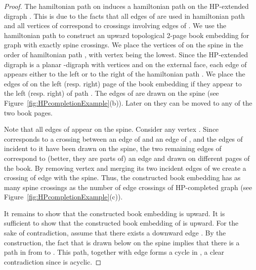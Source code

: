 \documentclass{myllncs-mixalis}
\begin{document}
\begin{proof}
 The hamiltonian path  on  induces a hamiltonian path
  on the HP-extended digraph . This is due to the facts that all
 edges of  are used in hamiltonian path  and all vertices of
  correspond to crossings involving edges of . We  use
 the hamiltonian path  to construct an upward topological
 2-page book embedding for graph  with exactly  spine
 crossings. We place the vertices of  on the spine in the order
 of hamiltonian path , with vertex  being the lowest.
 Since the HP-extended digraph  is a planar -digraph with vertices  and  on the external face,
 each edge of 
 appears either to the left or to the right of the hamiltonian path
 .
 We place the  edges of   on the left (resp. right) page of the book embedding if
 they appear to the left (resp. right) of path . The edges of
  are drawn on the spine (see Figure~\ref{fig:HPcompletionExample}(b)).
 Later on they can be moved to any of
 the two book pages.

 Note that all edges of  appear on the spine. Consider any vertex  .
 Since  corresponds to a crossing between an edge of  and an edge of
 , and the edges of  incident to it have been drawn
 on the spine, the two remaining edges of  correspond to (better, they are parts of) an edge 
 and  drawn on
 different pages of the book.   By removing vertex  and merging
 its two incident edges of  we create a crossing of edge
  with the spine. Thus, the constructed book embedding has as
 many spine crossings as the number of edge crossings of
 HP-completed graph  (see Figure~\ref{fig:HPcompletionExample}(c)).

 It remains to show that the
 constructed book embedding is upward. It is sufficient to show that the constructed book
 embedding of  is upward. For the sake of contradiction, assume
 that there exists a downward edge . By the construction, the fact
 that  is drawn below  on the spine implies that there is a
 path in  from  to . This path, together with edge
  forms a cycle in , a clear contradiction since 
 is acyclic.


\end{proof}
\end{document}
